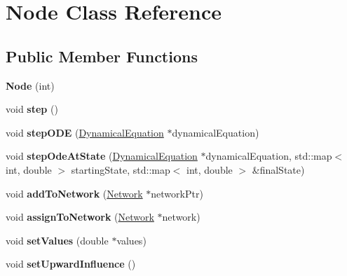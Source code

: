 \hypertarget{classNode}{}\section{Node Class Reference}
\label{classNode}
\subsection*{Public Member Functions}
\begin{DoxyCompactItemize}
\item 
{\bfseries Node} (int)\hypertarget{classNode_aff71d952af8363f046a67a8b12194e46}{}\label{classNode_aff71d952af8363f046a67a8b12194e46}

\item 
void {\bfseries step} ()\hypertarget{classNode_aeca7ef58472c76e9e751226abc2f6454}{}\label{classNode_aeca7ef58472c76e9e751226abc2f6454}

\item 
void {\bfseries step\+O\+DE} (\hyperlink{classDynamicalEquation}{Dynamical\+Equation} $\ast$dynamical\+Equation)\hypertarget{classNode_afe30b7fc1388bb03bf2db231cc1c8656}{}\label{classNode_afe30b7fc1388bb03bf2db231cc1c8656}

\item 
void {\bfseries step\+Ode\+At\+State} (\hyperlink{classDynamicalEquation}{Dynamical\+Equation} $\ast$dynamical\+Equation, std\+::map$<$ int, double $>$ starting\+State, std\+::map$<$ int, double $>$ \&final\+State)\hypertarget{classNode_aeb2d389fbdfff8a2b4df8da2293b0e0d}{}\label{classNode_aeb2d389fbdfff8a2b4df8da2293b0e0d}

\item 
void {\bfseries add\+To\+Network} (\hyperlink{classNetwork}{Network} $\ast$network\+Ptr)\hypertarget{classNode_a0152bc26929db78224617004ddf9aadb}{}\label{classNode_a0152bc26929db78224617004ddf9aadb}

\item 
void {\bfseries assign\+To\+Network} (\hyperlink{classNetwork}{Network} $\ast$network)\hypertarget{classNode_aa0bfc27090c27167472e0bc4499ad17c}{}\label{classNode_aa0bfc27090c27167472e0bc4499ad17c}

\item 
void {\bfseries set\+Values} (double $\ast$values)\hypertarget{classNode_a507e58ea4aa68188b159643fbd90e657}{}\label{classNode_a507e58ea4aa68188b159643fbd90e657}

\item 
void {\bfseries set\+Upward\+Influence} ()\hypertarget{classNode_a905952508ade253c1e8c826ce4ab5434}{}\label{classNode_a905952508ade253c1e8c826ce4ab5434}


\end{DoxyCompactItemize}
